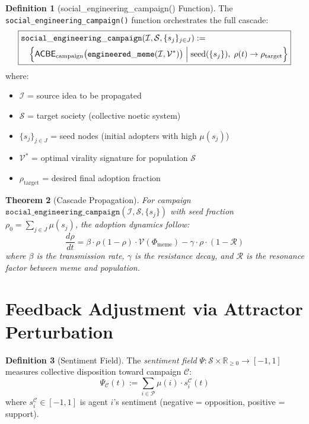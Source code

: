 \documentclass[11pt,twoside]{book}
\theoremstyle{definition}
\newtheorem{definition}{Definition}[chapter]
\theoremstyle{plain}
\newtheorem{theorem}[definition]{Theorem}
\theoremstyle{remark}
\newcommand{\Frac}{\Phi}
\newcommand{\ACBE}{\mathsf{ACBE}}
\begin{document}
\begin{definition}[social\_engineering\_campaign() Function]
\label{def:se-campaign}
The \texttt{social\_engineering\_campaign()} function orchestrates the full cascade:
\[
\boxed{
\begin{aligned}
    &\mathtt{social\_engineering\_campaign}(\mathcal{I}, \mathcal{S}, \{s_j\}_{j \in J}) := \\
    &\quad \Bigl\{ \ACBE_{\mathrm{campaign}}\bigl(\mathtt{engineered\_meme}(\mathcal{I}, \mathcal{V}^*)\bigr)
    \;\Big|\; \mathrm{seed}(\{s_j\}), \; \rho(t) \to \rho_{\mathrm{target}} \Bigr\}
\end{aligned}
}
\]
where:
\begin{itemize}
    \item $\mathcal{I}$ = source idea to be propagated
    \item $\mathcal{S}$ = target society (collective noetic system)
    \item $\{s_j\}_{j \in J}$ = seed nodes (initial adopters with high $\mu(s_j)$)
    \item $\mathcal{V}^*$ = optimal virality signature for population $\mathcal{S}$
    \item $\rho_{\mathrm{target}}$ = desired final adoption fraction
\end{itemize}
\end{definition}

\begin{theorem}[Cascade Propagation]
\label{thm:cascade-propagation}
For campaign $\mathtt{social\_engineering\_campaign}(\mathcal{I}, \mathcal{S}, \{s_j\})$ with seed fraction $\rho_0 = \sum_{j \in J} \mu(s_j)$, the adoption dynamics follow:
\[
    \frac{d\rho}{dt} = \beta \cdot \rho(1 - \rho) \cdot \mathcal{V}(\Frac_{\mathrm{meme}})
    - \gamma \cdot \rho \cdot (1 - \mathcal{R})
\]
where $\beta$ is the transmission rate, $\gamma$ is the resistance decay, and $\mathcal{R}$ is the resonance factor between meme and population.
\end{theorem}

\section{Feedback Adjustment via Attractor Perturbation}

\begin{definition}[Sentiment Field]
\label{def:sentiment-field}
The \emph{sentiment field} $\Psi : \mathcal{S} \times \mathbb{R}_{\geq 0} \to [-1, 1]$ measures collective disposition toward campaign $\mathcal{C}$:
\[
    \Psi_{\mathcal{C}}(t) := \sum_{i \in \mathcal{P}} \mu(i) \cdot s_i^{\mathcal{C}}(t)
\]
where $s_i^{\mathcal{C}} \in [-1, 1]$ is agent $i$'s sentiment (negative = opposition, positive = support).
\end{definition}
\end{document}
